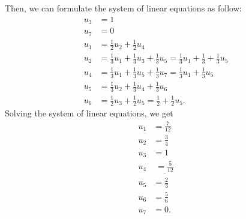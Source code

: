 \documentclass{article}
\begin{document}
Then, we can formulate the system of linear equations as follow:
\begin{align}
    u_3 & = 1 \nonumber \\
    u_7 & = 0 \nonumber \\
    u_1 & = \frac{1}{2}u_2 + \frac{1}{2}u_4 \nonumber \\
    u_2 & = \frac{1}{3}u_1 + \frac{1}{3}u_3 + \frac{1}{3}u_5 = \frac{1}{3}u_1 +\frac{1}{3} + \frac{1}{3}u_5\nonumber \\
    u_4 & = \frac{1}{3}u_1 + \frac{1}{3}u_5 + \frac{1}{3}u_7 =\frac{1}{3}u_1 + \frac{1}{3}u_5\nonumber \\
    u_5 & = \frac{1}{3}u_2 + \frac{1}{3}u_4 + \frac{1}{3}u_6 \nonumber \\
    u_6 & = \frac{1}{2}u_3 + \frac{1}{2}u_5 = \frac{1}{2} + \frac{1}{2}u_5. \nonumber 
\end{align}
Solving the system of linear equations, we get 
\begin{align}
    u_1 & = \frac{7}{12} \nonumber \\
    u_2 & = \frac{3}{4} \nonumber \\
    u_3 & = 1 \nonumber \\
    u_4 & \; \underline{= \frac{5}{12}} \nonumber \\
    u_5 & = \frac{2}{3} \nonumber \\
    u_6 & = \frac{5}{6} \nonumber \\
    u_7 & = 0. \nonumber
\end{align}
\end{document}
